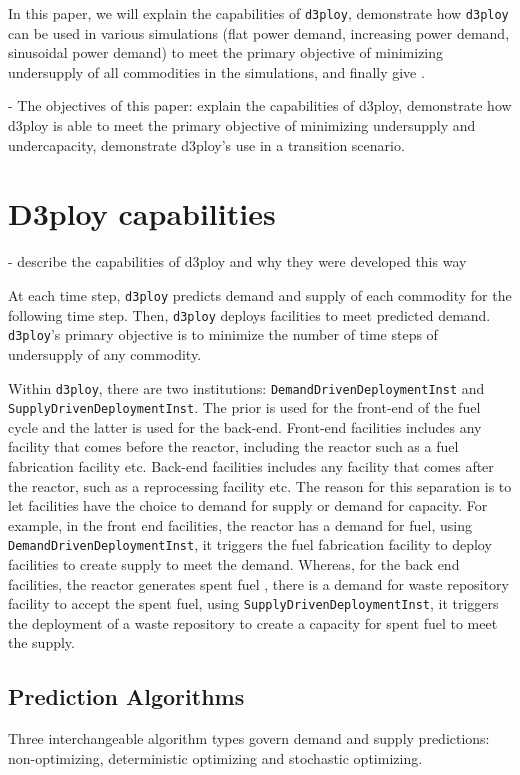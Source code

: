 \documentclass[11pt,letterpaper]{article}
\newcommand{\deploy}{\texttt{d3ploy}\xspace}%
\begin{document}
In this paper, we will explain the capabilities of \deploy, 
demonstrate how \deploy can be used in various simulations (flat 
power demand, increasing power demand, sinusoidal power demand)
to meet the primary objective of minimizing undersupply of all 
commodities in the simulations, and finally give  . 


- The objectives of this paper: explain the capabilities of d3ploy, 
demonstrate how d3ploy is able to meet the primary objective of 
minimizing undersupply and undercapacity, demonstrate d3ploy's use 
in a transition scenario.  


\section{D3ploy capabilities}
- describe the capabilities of d3ploy and why they were developed
this way 

At each time step, \deploy predicts demand and supply of each 
commodity for the following time step.
Then, \deploy deploys facilities to meet predicted demand. 
\deploy's primary objective is to minimize the number of time 
steps of undersupply of any commodity. 

Within \deploy, there are two institutions: 
\texttt{DemandDrivenDeploymentInst} and \texttt{SupplyDrivenDeploymentInst}. 
The prior is used for the front-end of the fuel cycle and the latter is used 
for the back-end. 
Front-end facilities includes any facility that comes before the reactor, 
including the reactor such as a fuel fabrication facility etc.  
Back-end facilities includes any facility that comes after the reactor, 
such as a reprocessing facility etc. 
The reason for this separation is to let facilities have the choice 
to demand for supply or demand for capacity. 
For example, in the front end facilities, the reactor has a demand for 
fuel, using \texttt{DemandDrivenDeploymentInst}, it triggers the fuel 
fabrication facility to deploy facilities to create supply to meet 
the demand. 
Whereas, for the back end facilities, the reactor generates spent fuel 
, there is a demand for waste repository facility to accept the 
spent fuel, using \texttt{SupplyDrivenDeploymentInst}, it triggers the
deployment of a waste repository to create a capacity for spent fuel 
to meet the supply. 

\subsection{Prediction Algorithms}
Three interchangeable algorithm types govern demand and supply 
predictions: non-optimizing, deterministic optimizing and stochastic
optimizing. 
\end{document}
